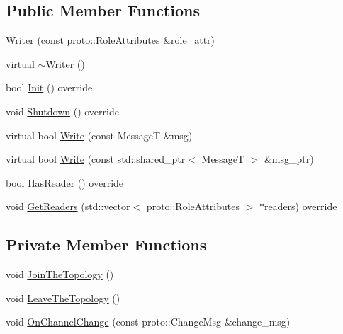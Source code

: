 \subsection*{Public Member Functions}
\begin{DoxyCompactItemize}
\item 
\hyperlink{classapollo_1_1cyber_1_1Writer_a8c4b7af7821be7e2911eec00549fb4db}{Writer} (const proto\-::\-Role\-Attributes \&role\-\_\-attr)
\item 
virtual \hyperlink{classapollo_1_1cyber_1_1Writer_a083e3ae7d2709b1ac4513a50741b11f9}{$\sim$\-Writer} ()
\item 
bool \hyperlink{classapollo_1_1cyber_1_1Writer_a3a8efad4bf1917f541d41e3102ef8776}{Init} () override
\item 
void \hyperlink{classapollo_1_1cyber_1_1Writer_a915a8e6c0bb86a98f4ab09d41a9d3242}{Shutdown} () override
\item 
virtual bool \hyperlink{classapollo_1_1cyber_1_1Writer_ac801147d965824c910da92626e4b9b05}{Write} (const Message\-T \&msg)
\item 
virtual bool \hyperlink{classapollo_1_1cyber_1_1Writer_a793eaf46f34f2d46d0225a1a6cc3fd50}{Write} (const std\-::shared\-\_\-ptr$<$ Message\-T $>$ \&msg\-\_\-ptr)
\item 
bool \hyperlink{classapollo_1_1cyber_1_1Writer_a0eba2d4599a273a2dc56e5ca5845ebd1}{Has\-Reader} () override
\item 
void \hyperlink{classapollo_1_1cyber_1_1Writer_abf208c7a535967956542965c9a6d6e58}{Get\-Readers} (std\-::vector$<$ proto\-::\-Role\-Attributes $>$ $\ast$readers) override
\end{DoxyCompactItemize}
\subsection*{Private Member Functions}
\begin{DoxyCompactItemize}
\item 
void \hyperlink{classapollo_1_1cyber_1_1Writer_ab034d57bd2386eaae499e9b2bc1cad9b}{Join\-The\-Topology} ()
\item 
void \hyperlink{classapollo_1_1cyber_1_1Writer_a1d3098c8b39eee440005bcf88b2c4a9a}{Leave\-The\-Topology} ()
\item 
void \hyperlink{classapollo_1_1cyber_1_1Writer_a03ca679668b1bb1cee9a6baf4f399c21}{On\-Channel\-Change} (const proto\-::\-Change\-Msg \&change\-\_\-msg)
\end{DoxyCompactItemize}
